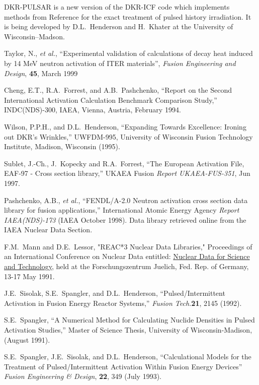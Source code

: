 \begin{thebibliography}{100}
 DKR-PULSAR is a new version of the DKR-ICF code which
  implements methods from Reference  for the exact
  treatment of pulsed history irradiation.  It is being developed by
  D.L.~Henderson and H.~Khater at the University of Wisconsin--Madson.
  
 Taylor, N., \textsl{et al.}, ``Experimental
  validation of calculations of decay heat induced by 14 MeV neutron
  activation of ITER materials'', \textsl{Fusion Engineering and
    Design}, \textbf{45}, March 1999
  
 Cheng, E.T., R.A.~Forrest, and
  A.B.~Pashchenko, ``Report on the Second International Activation
  Calculation Benchmark Comparison Study,'' INDC(NDS)-300, IAEA,
  Vienna, Austria, February 1994.
  
 Wilson, P.P.H., and D.L.~Henderson, ``Expanding
  Towards Excellence: Ironing out DKR's Wrinkles,'' UWFDM-995,
  University of Wisconsin Fusion Technology Institute, Madison,
  Wisconsin (1995).
  
 Sublet, J.-Ch., J.~Kopecky and R.A.~Forrest, ``The
  European Activation File, EAF-97 - Cross section library,'' UKAEA
  Fusion \textsl{Report UKAEA-FUS-351}, Jun 1997.
  
 Pashchenko, A.B., \textsl{et al.}, ``FENDL/A-2.0
  Neutron activation cross section data library for fusion
  applications,'' International Atomic Energy Agency \textsl{Report
    IAEA(NDS)-173} (IAEA October 1998).  Data library retrieved online
  from the IAEA Nuclear Data Section.

F.M.~Mann and D.E.~Lessor, "REAC*3 Nuclear Data
  Libraries," Proceedings of an International Conference on Nuclear
  Data entitled: \underline{Nuclear Data for Science and Technology},
  held at the Forschungszentrum Juelich, Fed. Rep. of Germany, 13-17
  May 1991.

 J.E.~Sisolak, S.E.~Spangler, and D.L.~Henderson,
  ``Pulsed/Intermittent Activation in Fusion Energy Reactor Systems,''
  \textsl{Fusion Tech.}\textbf{21}, 2145 (1992).
  
 S.E.~Spangler, ``A Numerical Method for
  Calculating Nuclide Densities in Pulsed Activation Studies,'' Master
  of Science Thesis, University of Wisconsin-Madison, (August 1991).
  
 S.E.~Spangler, J.E.~Sisolak, and D.L.~Henderson,
  ``Calculational Models for the Treatment of Pulsed/Intermittent
  Activation Within Fusion Energy Devices'' \textsl{Fusion Engineering
    \& Design}, \textbf{22}, 349 (July 1993).
  

\end{thebibliography}
